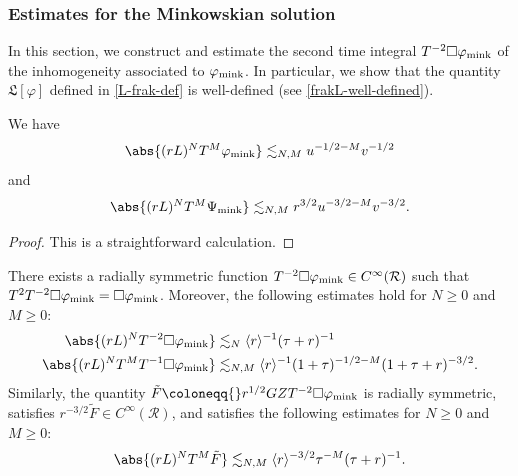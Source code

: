\documentclass[10pt, reqno]{amsart}
\begin{document}
\subsubsection{Estimates for the Minkowskian solution}
\label{inhomogeneous-estimates} In this section, we construct and estimate the
second time integral \(T^{-2}\Box{}\varphi_{\textnormal{mink}}\) of the
inhomogeneity associated to \(\varphi_{\textnormal{mink}}\). In particular, we
show that the quantity \(\mathfrak{L}[\varphi{}]\) defined in \cref{L-frak-def} is
well-defined (see \cref{frakL-well-defined}).
\begin{lemma}
We have
\begin{equation}
\abs{(rL)^NT^M\varphi{}_{\textnormal{mink}}}\lesssim_{N,M} u^{-1/2-M}v^{-1/2}
\end{equation}
and
\begin{equation}
\abs{(rL)^NT^M\Psi{}_{\textnormal{mink}}}\lesssim_{N,M} r^{3/2}u^{-3/2-M}v^{-3/2}.
\end{equation}
\label{mink-energy}
\end{lemma}
\begin{proof}
This is a straightforward calculation.
\end{proof}
\begin{proposition}
There exists a radially symmetric function
\(T^{-2}\Box{}\varphi{}_{\textnormal{mink}} \in C^\infty(\mathcal{R})\) such
that \(T^2T^{-2}\Box{}\varphi_{\textnormal{mink}} =
\Box{}\varphi_{\textnormal{mink}}\). Moreover, the following estimates hold for
\(N\ge 0\) and \(M\ge 0\):
\begin{align}
\abs{(rL)^NT^{-2}\Box{}\varphi{}_{\textnormal{mink}}}&\lesssim _{N} \langle{}r\rangle{}^{-1}(\tau{}+r)^{-1} \label{Tinv-inhomogeneity} \\
\abs{(rL)^NT^MT^{-1}\Box{}\varphi{}_{\textnormal{mink}}}&\lesssim_{N,M} \langle{}r\rangle{}^{-1}(1+\tau{})^{-1/2-M}(1+\tau{}+r)^{-3/2}. \label{box-inhomogeneity-M}
\end{align}
Similarly, the quantity \(\tilde{F}\coloneqq{}r^{1/2}GZT^{-2}\Box{}\varphi{}_{\textnormal{mink}}\)
is radially symmetric, satisfies \(r^{-3/2}\tilde{F}\in C^\infty(\mathcal{R})\), and
satisfies the following estimates for \(N\ge 0\) and \(M\ge 0\):
\begin{equation}\label{Tinv-Psi-inhomongeneity}
\abs{(rL)^NT^M\tilde{F}} \lesssim_{N,M} \langle{}r\rangle^{-3/2}\tau{}^{-M}(\tau{}+r)^{-1}.
\end{equation}
\label{Tinv-mink}
\end{proposition}
\end{document}
